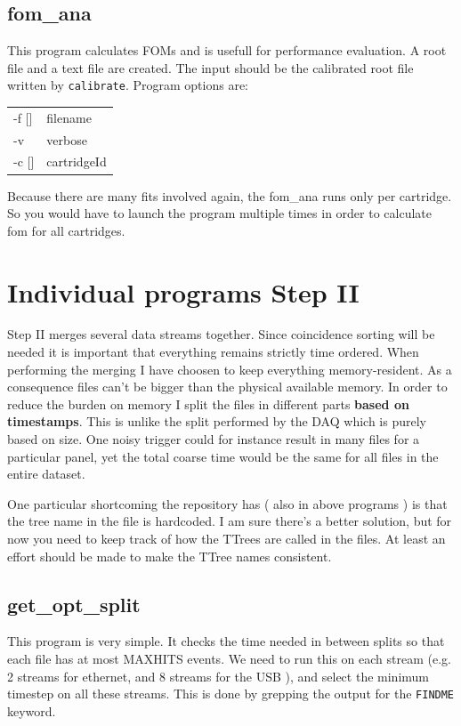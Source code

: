 \documentclass[12pt]{article}
\begin{document}
\subsection{fom\_ana}
This program calculates FOMs and is usefull for performance evaluation. A root file and a text file are created. The input should be the calibrated root file written by {\tt calibrate}. Program options are:
\begin{tabular}{ll}
-f []& filename\\
-v & verbose\\
-c []& cartridgeId\\
\end{tabular}
Because there are many fits involved again, the fom\_ana runs only per cartridge. So you would have to launch the program multiple times in order to calculate fom for all cartridges.

\section{Individual programs Step II}
Step II merges several data streams together. Since coincidence sorting will
be needed it is important that everything remains strictly time ordered. When
performing the merging I have choosen to keep everything memory-resident. As a
consequence files can't be bigger than the physical available memory. In order
to reduce the burden on memory I split the files in different parts {\bf based
  on timestamps}. This is unlike the split performed by the DAQ which is
purely based on size. One noisy trigger could for instance result in many
files for a particular panel, yet the total coarse time would be the same for
all files in the entire dataset. 

One particular shortcoming the repository has ( also in above programs ) is
that the tree name in the file is hardcoded. I am sure there's a better
solution, but for now you need to keep track of how the TTrees are called in
the files. At least an effort should be made to make the TTree names consistent.

\subsection{get\_opt\_split}
This program is very simple. It checks the time needed in between splits so that each file has at most MAXHITS events. We need to run this on each stream (e.g. 2 streams for ethernet, and 8 streams for the USB ), and select the minimum timestep on all these streams. This is done by grepping the output for the {\tt FINDME} keyword. \\
\end{document}
